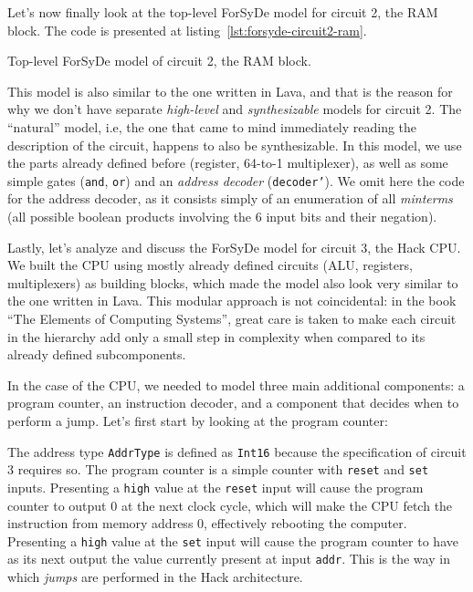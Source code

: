             Let's now finally look at the top-level ForSyDe model for circuit 2, the RAM block.  The
            code is presented at listing~\ref{lst:forsyde-circuit2-ram}.

            \begin{listing}[h!]
                \caption{Top-level ForSyDe model of circuit 2, the RAM block.
                    \label{lst:forsyde-circuit2-ram}}
            \end{listing}

            This model is also similar to the one written in Lava, and that is the reason for why we
            don't have separate \emph{high-level} and \emph{synthesizable} models for circuit 2. The
            ``natural'' model, i.e, the one that came to mind immediately reading the description of
            the circuit, happens to also be synthesizable. In this model, we use the parts already
            defined before (register, 64-to-1 multiplexer), as well as some simple gates
            (\texttt{and}, \texttt{or}) and an \emph{address decoder} (\texttt{decoder'}). We omit
            here the code for the address decoder, as it consists simply of an enumeration of all
            \emph{minterms} (all possible boolean products involving the 6 input bits and their
            negation).

            Lastly, let's analyze and discuss the ForSyDe model for circuit 3, the Hack CPU. We
            built the CPU using mostly already defined circuits (ALU, registers, multiplexers) as
            building blocks, which made the model also look very similar to the one written in Lava.
            This modular approach is not coincidental: in the book ``The Elements of Computing
            Systems''\cite{nand2tetris-book}, great care is taken to make each circuit in the
            hierarchy add only a small step in complexity when compared to its already defined
            subcomponents.

            In the case of the CPU, we needed to model three main additional components: a program
            counter, an instruction decoder, and a component that decides when to perform a jump.
            Let's first start by looking at the program counter:


            The address type \texttt{AddrType} is defined as \texttt{Int16} because the
            specification of circuit 3 requires so. The program counter is a simple counter with
            \texttt{reset} and \texttt{set} inputs. Presenting a \texttt{high} value at the
            \texttt{reset} input will cause the program counter to output 0 at the next clock cycle,
            which will make the CPU fetch the instruction from memory address 0, effectively
            rebooting the computer. Presenting a \texttt{high} value at the \texttt{set} input will
            cause the program counter to have as its next output the value currently present at
            input \texttt{addr}. This is the way in which \emph{jumps} are performed in the Hack
            architecture.

